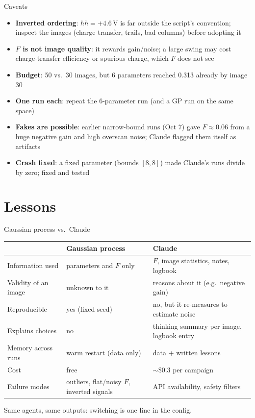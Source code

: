 \documentclass[aspectratio=169,10pt]{beamer}
\begin{document}
\begin{frame}{Caveats}
  \begin{itemize}
    \item \textbf{Inverted ordering}: $hh=+4.6$\,V is far outside the script's convention;
          inspect the images (charge transfer, trails, bad columns) before adopting it
    \item \textbf{$F$ is not image quality}: it rewards gain/noise; a large swing may cost
          charge-transfer efficiency or spurious charge, which $F$ does not see
    \item \textbf{Budget}: 50 vs.\ 30 images, but 6 parameters reached 0.313 already by image 30
    \item \textbf{One run each}: repeat the 6-parameter run (and a GP run on the same space)
    \item \textbf{Fakes are possible}: earlier narrow-bound runs (Oct 7) gave $F\approx0.06$ from
          a huge negative gain and high overscan noise; Claude flagged them itself as artifacts
    \item \textbf{Crash fixed}: a fixed parameter (bounds $[8, 8]$) made Claude's runs divide by
          zero; fixed and tested
  \end{itemize}
\end{frame}

\section{Lessons}

\begin{frame}{Gaussian process vs.\ Claude}
  \small
  \begin{tabular}{p{}p{}p{}}
    \toprule
    & Gaussian process & Claude \\
    \midrule
    Information used & parameters and $F$ only & $F$, image statistics, notes, logbook \\
    Validity of an image & unknown to it & reasons about it (e.g.\ negative gain) \\
    Reproducible & yes (fixed seed) & no, but it re-measures to estimate noise \\
    Explains choices & no & thinking summary per image, logbook entry \\
    Memory across runs & warm restart (data only) & data + written lessons \\
    Cost & free & $\sim$\$0.3 per campaign \\
    Failure modes & outliers, flat/noisy $F$, inverted signals & API availability, safety filters \\
    \bottomrule
  \end{tabular}

  \vspace{3mm}
  Same agents, same outputs: switching is one line in the config.
\end{frame}
\end{document}
